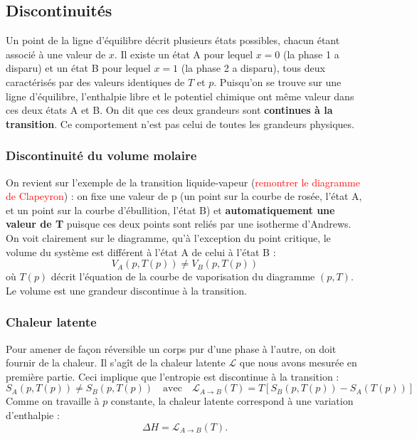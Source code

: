 \documentclass[11pt,a4paper]{report}
\begin{document}
\subsection{Discontinuités}

Un point de la ligne d'équilibre décrit plusieurs états possibles, chacun étant associé à une valeur de $x$. Il existe un état A pour lequel $x = 0$ (la phase 1 a disparu) et un état B pour lequel $x = 1$ (la phase 2 a disparu), tous deux caractérisés par des valeurs identiques de $T$ et $p$. Puisqu'on se trouve sur une ligne d'équilibre, l'enthalpie libre et le potentiel chimique ont même valeur dans ces deux états A et B. On dit que ces deux grandeurs sont \textbf{continues à la transition}. Ce comportement n'est pas celui de toutes les grandeurs physiques.

\subsubsection*{Discontinuité du volume molaire}

On revient sur l'exemple de la transition liquide-vapeur (\textcolor{red}{remontrer le diagramme de Clapeyron}) : on fixe une valeur de p (un point sur la courbe de rosée, l'état A, et un point sur la courbe d'ébullition, l'état B) et \textbf{automatiquement une valeur de T} puisque ces deux points sont reliés par une isotherme d'Andrews. On voit clairement sur le diagramme, qu'à l'exception du point critique, le volume du système est différent à l'état A de celui à l'état B :
\begin{equation}
	V_A(p,T(p)) \neq V_B(p,T(p))
\end{equation}
où $T(p)$ décrit l'équation de la courbe de vaporisation du diagramme $(p,T)$. Le volume est une grandeur discontinue à la transition.
 
\subsubsection*{Chaleur latente}

Pour amener de façon réversible un corps pur d'une phase à l'autre, on doit fournir de la chaleur. Il s'agît de la chaleur latente $\mathcal{L}$ que nous avons mesurée en première partie. Ceci implique que l'entropie est discontinue à la transition :
\begin{equation}
	S_A(p,T(p)) \neq S_B(p,T(p))\quad\text{avec}\quad \mathcal{L}_{A\rightarrow B}(T) 
	= T\left[S_B(p,T(p))-S_A(T(p))\right]
\end{equation}
Comme on travaille à $p$ constante, la chaleur latente correspond à une variation d'enthalpie :
\begin{equation}
	\Delta H = \mathcal{L}_{A\rightarrow B}(T).
\end{equation}
\end{document}
